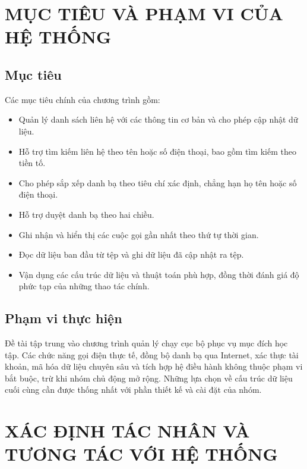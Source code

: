 \documentclass[12pt,a4paper]{report}
\begin{document}
\section{MỤC TIÊU VÀ PHẠM VI CỦA HỆ THỐNG}

\subsection{Mục tiêu}

Các mục tiêu chính của chương trình gồm:\par
\begin{itemize}[leftmargin=1.2cm]
\item Quản lý danh sách liên hệ với các thông tin cơ bản và cho phép cập nhật dữ liệu.
\item Hỗ trợ tìm kiếm liên hệ theo tên hoặc số điện thoại, bao gồm tìm kiếm theo tiền tố.
\item Cho phép sắp xếp danh bạ theo tiêu chí xác định, chẳng hạn họ tên hoặc số điện thoại.
\item Hỗ trợ duyệt danh bạ theo hai chiều.
\item Ghi nhận và hiển thị các cuộc gọi gần nhất theo thứ tự thời gian.
\item Đọc dữ liệu ban đầu từ tệp và ghi dữ liệu đã cập nhật ra tệp.
\item Vận dụng các cấu trúc dữ liệu và thuật toán phù hợp, đồng thời đánh giá độ phức tạp của những thao tác chính.
\end{itemize}

\subsection{Phạm vi thực hiện}

Đề tài tập trung vào chương trình quản lý chạy cục bộ phục vụ mục đích học tập. Các chức năng gọi điện thực tế, đồng bộ danh bạ qua Internet, xác thực tài khoản, mã hóa dữ liệu chuyên sâu và tích hợp hệ điều hành không thuộc phạm vi bắt buộc, trừ khi nhóm chủ động mở rộng. Những lựa chọn về cấu trúc dữ liệu cuối cùng cần được thống nhất với phần thiết kế và cài đặt của nhóm.\par
\section{XÁC ĐỊNH TÁC NHÂN VÀ TƯƠNG TÁC VỚI HỆ THỐNG}
\end{document}

